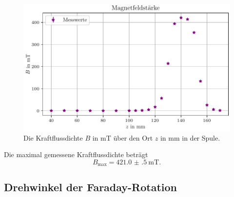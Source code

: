 \begin{figure}[H]
    \centering
    \includegraphics[width=\textwidth]{plots/magnetfeld.pdf}
    \caption{Die Kraftflussdichte $B$ in $\si{\milli\tesla}$ über den Ort $z$ in $\si{\milli\meter}$ in der Spule.}
    \label{fig:magnetfeld}
\end{figure}
Die maximal gemessene Kraftflussdichte beträgt
\begin{equation*}
    B_\text{max} = \qty{421.0(5)}{\milli\tesla}.
\end{equation*}


\subsection{Drehwinkel der Faraday-Rotation}

